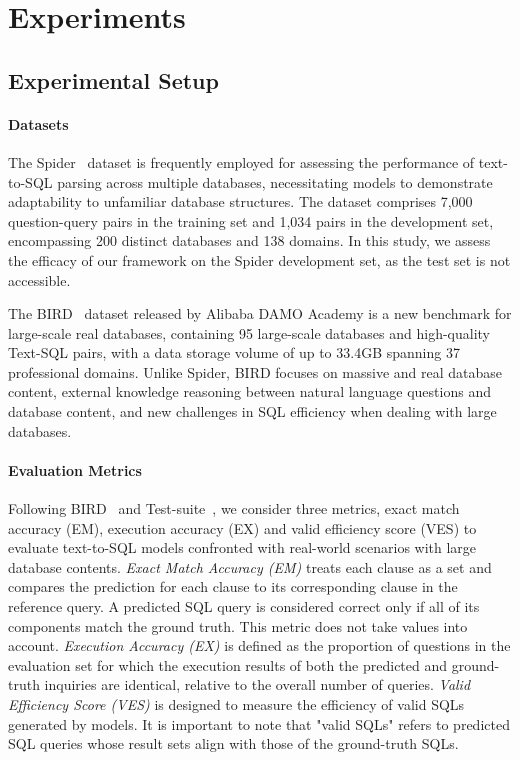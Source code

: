 \section{Experiments}

\subsection{Experimental Setup}
\label{experiment_setup}

\paragraph{Datasets} 
The Spider~\citep{YuSpider2018} dataset is frequently employed for assessing the performance of text-to-SQL parsing across multiple databases, necessitating models to demonstrate adaptability to unfamiliar database structures. 
The dataset comprises 7,000 question-query pairs in the training set and 1,034 pairs in the development set, encompassing 200 distinct databases and 138 domains. 
In this study, we assess the efficacy of our framework on the Spider development set, as the test set is not accessible.

The BIRD~\citep{li2023llm} dataset released by Alibaba DAMO Academy is a new benchmark for large-scale real databases, containing 95 large-scale databases and high-quality Text-SQL pairs, with a data storage volume of up to 33.4GB spanning 37 professional domains. Unlike Spider, BIRD focuses on massive and real database content, external knowledge reasoning between natural language questions and database content, and new challenges in SQL efficiency when dealing with large databases.

\paragraph{Evaluation Metrics}

Following BIRD~\citep{li2023llm} and Test-suite~\citep{zhong-etal-2020-semantic}, we consider three metrics, exact match accuracy (EM), execution accuracy (EX) and valid efficiency score (VES) to evaluate text-to-SQL models confronted with real-world scenarios with large database contents. 
\textit{Exact Match Accuracy (EM)} treats each clause as a set and compares the prediction for each clause to its corresponding clause in the reference query. A predicted SQL query is considered correct only if all of its components match the ground truth. This metric does not take values into account. 
\textit{Execution Accuracy (EX)} is defined as the proportion of questions in the evaluation set for which the execution results of both the predicted and ground-truth inquiries are identical, relative to the overall number of queries. 
\textit{Valid Efficiency Score (VES)} is designed to measure the efficiency of valid SQLs generated by models. It is important to note that "valid SQLs" refers to predicted SQL queries whose result sets align with those of the ground-truth SQLs.

